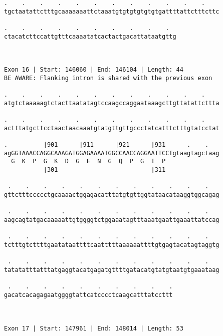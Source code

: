 \documentclass{article}
\begin{document}
\begin{Verbatim}
.    .    .    .    .    .    .    .    .    .    .    .    
tgctaatattctttgcaaaaaaattctaaatgtgtgtgtgtgtgattttattctttcttc
                                                            
.    .    .    .    .    .    .    .    .    .  
ctacatcttccattgtttcaaaatatcactactgacattataatgttg
                                                
                                                
 
Exon 16 | Start: 146060 | End: 146104 | Length: 44
BE AWARE: Flanking intron is shared with the previous exon
 
.    .    .    .    .    .    .    .    .    .    .    .    
atgtctaaaaagtctacttaatatagtccaagccaggaataaagcttgttatattcttta
                                                            
.    .    .    .    .    .    .    .    .    .    .    .    
actttatgcttcctaactaacaaatgtatgttgttgccctatcatttctttgtatcctat
                                                            
.          |901      |911      |921      |931      .    .   
agGGTAAACCAGGCAAAGATGGAGAAAATGGCCAACCAGGAATTCCTgtaagtagctaag
  G  K  P  G  K  D  G  E  N  G  Q  P  G  I  P               
           |301                          |311               
  
 .    .    .    .    .    .    .    .    .    .    .    .   
gttctttccccctgcaaaactggagacatttatgtgttggtataacataaggtggcagag
                                                            
 .    .    .    .    .    .    .    .    .    .    .    .   
aagcagtatgacaaaaattgtggggtctggaaatagtttaaatgaattgaaattatccag
                                                            
 .    .    .    .    .    .    .    .    .    .    .    .   
tctttgtcttttgaatataattttcaatttttaaaaaattttgtgagtacatagtaggtg
                                                            
 .    .    .    .    .    .    .    .    .    .    .    .   
tatatatttatttatgaggtacatgagatgttttgatacatgtatgtaatgtgaaataag
                                                            
 .    .    .    .    .    .    .    .    .    .
gacatcacagagaatggggtattcatcccctcaagcatttatccttt
                                               
                                               
 
Exon 17 | Start: 147961 | End: 148014 | Length: 53
 

\end{Verbatim}
\end{document}
